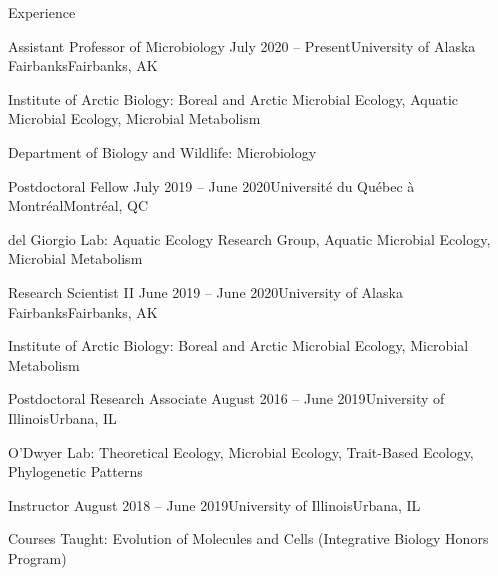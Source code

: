 \documentclass{resume} %
\begin{document}
\begin{rSection}{Experience}

    \begin{rSubsection}{Assistant Professor of Microbiology}
      {July 2020 -- Present}{University of Alaska Fairbanks}{Fairbanks, AK}
      \item Institute of Arctic Biology: Boreal and Arctic Microbial Ecology, Aquatic Microbial Ecology, Microbial Metabolism
      \item Department of Biology and Wildlife: Microbiology
    \end{rSubsection}  

    \begin{rSubsection}{Postdoctoral Fellow}
      {July 2019 -- June 2020}{Universit\'{e} du Qu\'{e}bec \`{a} Montr\'{e}al}{Montr\'{e}al, QC}
      \item del Giorgio Lab: Aquatic Ecology Research Group, Aquatic Microbial Ecology, Microbial Metabolism
    \end{rSubsection}
    
    \begin{rSubsection}{Research Scientist II}
      {June 2019 -- June 2020}{University of Alaska Fairbanks}{Fairbanks, AK}
      \item Institute of Arctic Biology: Boreal and Arctic Microbial Ecology, Microbial Metabolism
    \end{rSubsection}  
  
    \begin{rSubsection}{Postdoctoral Research Associate}
      {August 2016 -- June 2019}{University of Illinois}{Urbana, IL}
      \item O'Dwyer Lab: Theoretical Ecology, Microbial Ecology, Trait-Based Ecology, Phylogenetic Patterns
    \end{rSubsection}

    \begin{rSubsection}{Instructor}
      {August 2018 -- June 2019}{University of Illinois}{Urbana, IL}
      \item Courses Taught: Evolution of Molecules and Cells (Integrative Biology Honors Program)
    \end{rSubsection}


\end{rSection}
\end{document}
